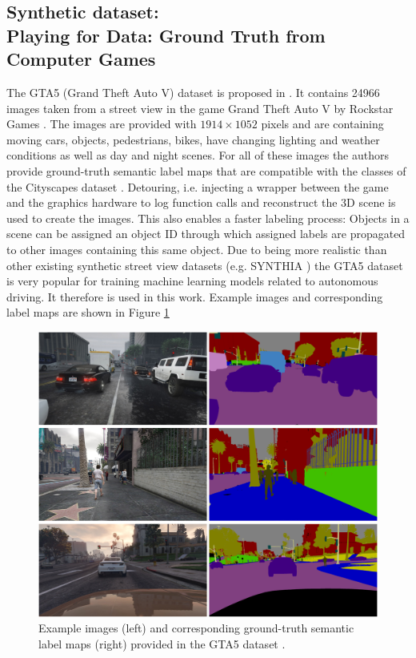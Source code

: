 \subsection{Synthetic dataset:\\
	Playing for Data: Ground Truth from Computer Games}

The GTA5 (Grand Theft Auto V) dataset is proposed in \cite{Richter_2016_ECCV}. It contains 24966 images taken from a street view in the game Grand Theft Auto V by Rockstar Games \cite{GTAV}. The images are provided with $1914 \times 1052$ pixels and are containing moving cars, objects, pedestrians, bikes, have changing lighting and weather conditions as well as day and night scenes. For all of these images the authors provide ground-truth semantic label maps that are compatible with the classes of the Cityscapes dataset \cite{Cordts_2016_CVPR}. Detouring, i.e. injecting a wrapper between the game and the graphics hardware to log function calls and reconstruct the 3D scene is used to create the images. This also enables a faster labeling process: Objects in a scene can be assigned an object ID through which assigned labels are propagated to other images containing this same object. Due to being more realistic than other existing synthetic street view datasets (e.g. SYNTHIA \cite{RosCVPR16}) the GTA5 dataset is very popular for training machine learning models related to autonomous driving. It therefore is used in this work. Example images and corresponding label maps are shown in Figure \ref{fig:p4d_examples} 


\begin{figure}
	\centering
	\includegraphics[width=\textwidth]{images/p4d_example.png}
	\caption{Example images (left) and corresponding ground-truth semantic label maps (right) provided in the GTA5 dataset \cite{Richter_2016_ECCV}.}
	\label{fig:p4d_examples}
\end{figure}

